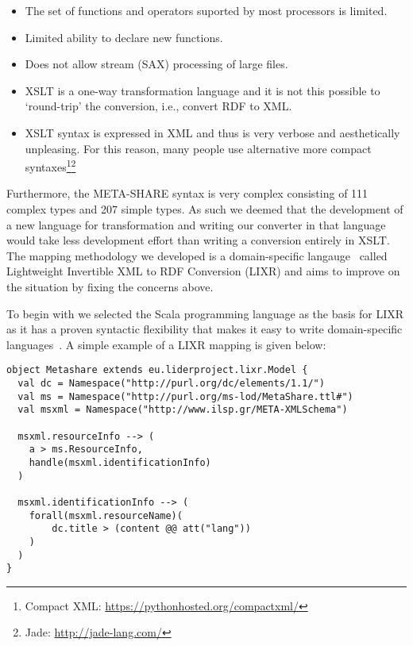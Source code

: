 \documentclass{llncs}
\begin{document}
\begin{itemize}
    \item The set of functions and operators suported by most processors is
        limited.
    \item Limited ability to declare new functions.
    \item Does not allow stream (SAX) processing of large files.
    \item XSLT is a one-way transformation language and it is not this possible
        to `round-trip' the conversion, i.e., convert RDF to XML.
    \item XSLT syntax is expressed in XML and thus is very verbose and
        aesthetically unpleasing. For this reason, many people use alternative
        more compact syntaxes\footnote{Compact XML:
        \url{https://pythonhosted.org/compactxml/}}\footnote{Jade:
        \url{http://jade-lang.com/}}
\end{itemize}

Furthermore, the META-SHARE syntax is very complex consisting of 111 complex
types and 207 simple types. As such we deemed that the development of a new
language for transformation and writing our converter in that language would
take less development effort than writing a conversion entirely in XSLT. The
mapping methodology we developed is a domain-specific
langauge~\cite{fowler2010domain} called Lightweight Invertible XML to RDF
Conversion (LIXR) and aims to improve on the situation by fixing the concerns
above. 

To begin with we selected the Scala programming language as the basis for LIXR
as it has a proven syntactic flexibility that makes it easy to write
domain-specific languages~\cite{wampler2008programming}. A simple example of a
LIXR mapping is given below:

{\footnotesize
\begin{verbatim}
object Metashare extends eu.liderproject.lixr.Model {
  val dc = Namespace("http://purl.org/dc/elements/1.1/")
  val ms = Namespace("http://purl.org/ms-lod/MetaShare.ttl#")
  val msxml = Namespace("http://www.ilsp.gr/META-XMLSchema")

  msxml.resourceInfo --> (
    a > ms.ResourceInfo,
    handle(msxml.identificationInfo)
  )

  msxml.identificationInfo --> (
    forall(msxml.resourceName)(
        dc.title > (content @@ att("lang"))
    )
  )
}
\end{verbatim}}
\end{document}
